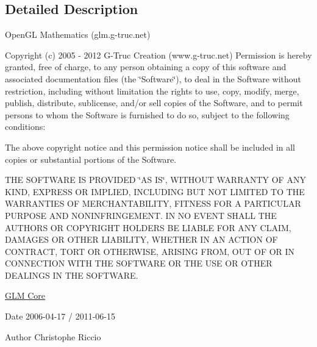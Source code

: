 \subsection{\-Detailed \-Description}
\-Open\-G\-L \-Mathematics (glm.\-g-\/truc.\-net)

\-Copyright (c) 2005 -\/ 2012 \-G-\/\-Truc \-Creation (www.\-g-\/truc.\-net) \-Permission is hereby granted, free of charge, to any person obtaining a copy of this software and associated documentation files (the \char`\"{}\-Software\char`\"{}), to deal in the \-Software without restriction, including without limitation the rights to use, copy, modify, merge, publish, distribute, sublicense, and/or sell copies of the \-Software, and to permit persons to whom the \-Software is furnished to do so, subject to the following conditions\-:

\-The above copyright notice and this permission notice shall be included in all copies or substantial portions of the \-Software.

\-T\-H\-E \-S\-O\-F\-T\-W\-A\-R\-E \-I\-S \-P\-R\-O\-V\-I\-D\-E\-D \char`\"{}\-A\-S I\-S\char`\"{}, \-W\-I\-T\-H\-O\-U\-T \-W\-A\-R\-R\-A\-N\-T\-Y \-O\-F \-A\-N\-Y \-K\-I\-N\-D, \-E\-X\-P\-R\-E\-S\-S \-O\-R \-I\-M\-P\-L\-I\-E\-D, \-I\-N\-C\-L\-U\-D\-I\-N\-G \-B\-U\-T \-N\-O\-T \-L\-I\-M\-I\-T\-E\-D \-T\-O \-T\-H\-E \-W\-A\-R\-R\-A\-N\-T\-I\-E\-S \-O\-F \-M\-E\-R\-C\-H\-A\-N\-T\-A\-B\-I\-L\-I\-T\-Y, \-F\-I\-T\-N\-E\-S\-S \-F\-O\-R \-A \-P\-A\-R\-T\-I\-C\-U\-L\-A\-R \-P\-U\-R\-P\-O\-S\-E \-A\-N\-D \-N\-O\-N\-I\-N\-F\-R\-I\-N\-G\-E\-M\-E\-N\-T. \-I\-N \-N\-O \-E\-V\-E\-N\-T \-S\-H\-A\-L\-L \-T\-H\-E \-A\-U\-T\-H\-O\-R\-S \-O\-R \-C\-O\-P\-Y\-R\-I\-G\-H\-T \-H\-O\-L\-D\-E\-R\-S \-B\-E \-L\-I\-A\-B\-L\-E \-F\-O\-R \-A\-N\-Y \-C\-L\-A\-I\-M, \-D\-A\-M\-A\-G\-E\-S \-O\-R \-O\-T\-H\-E\-R \-L\-I\-A\-B\-I\-L\-I\-T\-Y, \-W\-H\-E\-T\-H\-E\-R \-I\-N \-A\-N \-A\-C\-T\-I\-O\-N \-O\-F \-C\-O\-N\-T\-R\-A\-C\-T, \-T\-O\-R\-T \-O\-R \-O\-T\-H\-E\-R\-W\-I\-S\-E, \-A\-R\-I\-S\-I\-N\-G \-F\-R\-O\-M, \-O\-U\-T \-O\-F \-O\-R \-I\-N \-C\-O\-N\-N\-E\-C\-T\-I\-O\-N \-W\-I\-T\-H \-T\-H\-E \-S\-O\-F\-T\-W\-A\-R\-E \-O\-R \-T\-H\-E \-U\-S\-E \-O\-R \-O\-T\-H\-E\-R \-D\-E\-A\-L\-I\-N\-G\-S \-I\-N \-T\-H\-E \-S\-O\-F\-T\-W\-A\-R\-E.

\hyperlink{group__core}{\-G\-L\-M \-Core}

\begin{DoxyDate}{\-Date}
2006-\/04-\/17 / 2011-\/06-\/15 
\end{DoxyDate}
\begin{DoxyAuthor}{\-Author}
\-Christophe \-Riccio 
\end{DoxyAuthor}

